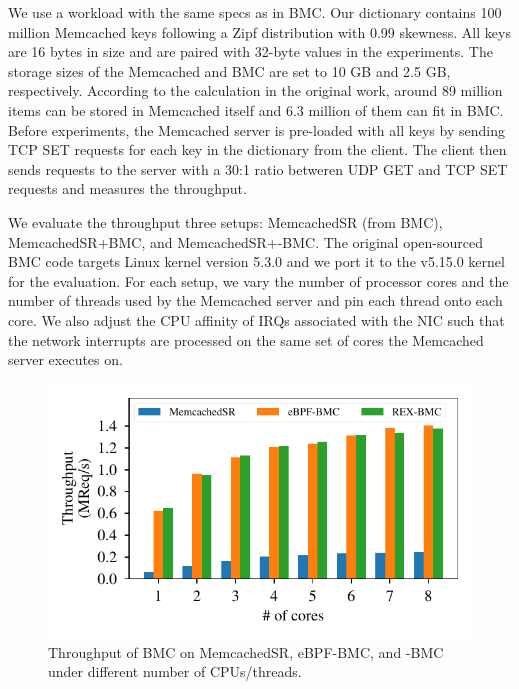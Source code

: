 
We use a workload with the same specs as in BMC.
Our dictionary contains 100 million Memcached keys following a Zipf
    distribution with 0.99 skewness.
All keys are 16 bytes in size and are paired with 32-byte values in the
    experiments.
The storage sizes of the Memcached and BMC are set to 10 GB and 2.5 GB,
    respectively.
According to the calculation in the original work, around 89 million items
    can be stored in Memcached itself and 6.3 million of them can fit in
    BMC.
Before experiments, the Memcached server is pre-loaded with all keys by
    sending TCP SET requests for each key in the dictionary from the client.
The client then sends requests to the server with a 30:1 ratio betweren UDP GET and
    TCP SET requests and measures the throughput.

We evaluate the throughput three setups: MemcachedSR (from BMC),
    MemcachedSR+BMC, and MemcachedSR+\projname{}-BMC.
The original open-sourced BMC code targets Linux kernel version 5.3.0 and we
    port it to the v5.15.0 \projname{} kernel for the evaluation.
For each setup, we vary the number of processor cores and the number of threads
    used by the Memcached server and pin each thread onto each core.
We also adjust the CPU affinity of IRQs associated with the NIC such that the
    network interrupts are processed on the same set of cores the Memcached
    server executes on.

\begin{figure}
    \includegraphics[width=1.0\linewidth]{figs/bmc.pdf}
    \centering
    \vspace{-25pt}
    \caption{Throughput of BMC on MemcachedSR, eBPF-BMC, and \projname{}-BMC
        under different number of CPUs/threads.
    }
    \label{fig:eval-bmc}
    \vspace{-10pt}
\end{figure}

